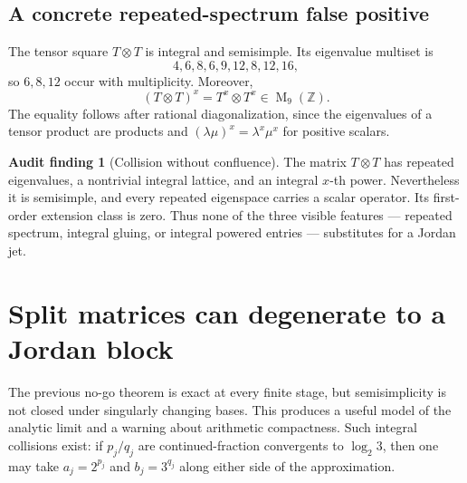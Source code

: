 \documentclass[11pt,oneside]{article}
\theoremstyle{definition}
\newtheorem{audit}[theorem]{Audit finding}
\theoremstyle{remark}
\newcommand{\Z}{\mathbb Z}
\newcommand{\Mat}{\operatorname{M}}
\begin{document}
\subsection{A concrete repeated-spectrum false positive}

The tensor square $T\otimes T$ is integral and semisimple.  Its eigenvalue multiset is
\[
 4,6,8,6,9,12,8,12,16,
\]
so $6,8,12$ occur with multiplicity.  Moreover,
\begin{equation}
 (T\otimes T)^x=T^x\otimes T^x\in\Mat_9(\Z).
 \label{eq:tensorpower}
\end{equation}
The equality follows after rational diagonalization, since the eigenvalues of a tensor product
are products and $(\lambda\mu)^x=\lambda^x\mu^x$ for positive scalars.

\begin{audit}[Collision without confluence]
The matrix $T\otimes T$ has repeated eigenvalues, a nontrivial integral lattice, and an integral
$x$-th power.  Nevertheless it is semisimple, and every repeated eigenspace carries a scalar
operator.  Its first-order extension class is zero.  Thus none of the three visible features
--- repeated spectrum, integral gluing, or integral powered entries --- substitutes for a
Jordan jet.
\end{audit}

\section{Split matrices can degenerate to a Jordan block}
\label{sec:splitdegeneration}

The previous no-go theorem is exact at every finite stage, but semisimplicity is not closed
under singularly changing bases.  This produces a useful model of the analytic limit and a
warning about arithmetic compactness.  Such integral collisions exist: if
$p_j/q_j$ are continued-fraction convergents to $\log_2 3$, then one may take
$a_j=2^{p_j}$ and $b_j=3^{q_j}$ along either side of the approximation.
\end{document}
